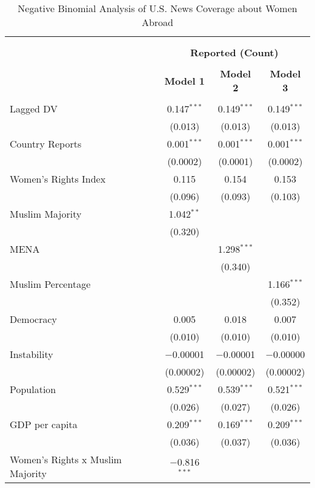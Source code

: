 
\begin{table}[!htbp] \centering 
  \caption{Negative Binomial Analysis of U.S. News Coverage about Women Abroad} 
  \label{table:negbin} 
\begin{tabular}{@{\extracolsep{5pt}}lccc} 
\\[-1.8ex]\hline \\[-1.8ex] 
\\[-1.8ex] & \multicolumn{3}{c}{\textbf{Reported (Count)}} \\ 
\\[-1.8ex] & \textbf{Model 1} & \textbf{Model 2} & \textbf{Model 3}\\ 
\hline \\[-1.8ex] 
 Lagged DV & 0.147$^{***}$ & 0.149$^{***}$ & 0.149$^{***}$ \\ 
  & (0.013) & (0.013) & (0.013) \\ 
  Country Reports & 0.001$^{***}$ & 0.001$^{***}$ & 0.001$^{***}$ \\ 
  & (0.0002) & (0.0001) & (0.0002) \\ 
  Women's Rights Index & 0.115 & 0.154 & 0.153 \\ 
  & (0.096) & (0.093) & (0.103) \\ 
  Muslim Majority & 1.042$^{**}$ &  &  \\ 
  & (0.320) &  &  \\ 
  MENA &  & 1.298$^{***}$ &  \\ 
  &  & (0.340) &  \\ 
  Muslim Percentage &  &  & 1.166$^{***}$ \\ 
  &  &  & (0.352) \\ 
  Democracy & 0.005 & 0.018 & 0.007 \\ 
  & (0.010) & (0.010) & (0.010) \\ 
  Instability & $-$0.00001 & $-$0.00001 & $-$0.00000 \\ 
  & (0.00002) & (0.00002) & (0.00002) \\ 
  Population & 0.529$^{***}$ & 0.539$^{***}$ & 0.521$^{***}$ \\ 
  & (0.026) & (0.027) & (0.026) \\ 
  GDP per capita & 0.209$^{***}$ & 0.169$^{***}$ & 0.209$^{***}$ \\ 
  & (0.036) & (0.037) & (0.036) \\ 
  Women's Rights x Muslim Majority & $-$0.816$^{***}$ &  &  \\ 

\end{tabular}
\end{table}
